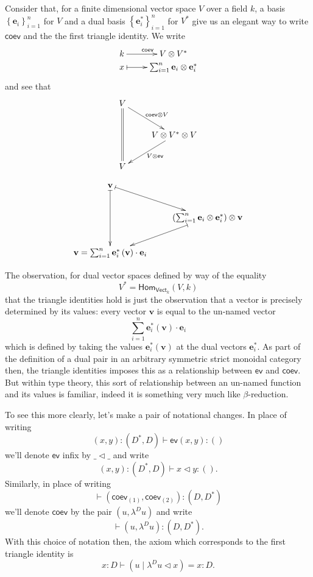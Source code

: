 \documentclass[pra,floatfix,
amsmath,superscriptaddress, 12pt]{article}
\theoremstyle{definition}
\newcommand{\evmap}{\mathsf{ev}}
\newcommand{\coev}{\mathsf{coev}}
\begin{document}
\par

Consider that, for a finite dimensional vector space $V$ over a field
$k$, a basis $\left\{ \mathbf{e}_{i}\right\} _{i=1}^{n}$ for $V$
and a dual basis $\left\{ \mathbf{e}_{i}^{*}\right\} _{i=1}^{n}$
for $V^{*}$ give us an elegant way to write $\coev$ and the the
first triangle identity. We write
\[
\xymatrixrowsep{0pc}\xymatrix{k\ar[r]^{\coev} & V\otimes V^{*}\\
x\ar@{|->}[r] & \sum_{i=1}^{n}\mathbf{e}_{i}\otimes\mathbf{e}_{i}^{*}
}
\]
and see that
\[
\begin{split}\vcenter{\vbox{\xymatrix{V\ar@{=}[dd]\ar[dr]^{\coev\otimes V}\\
 & V\otimes V^{*}\otimes V\ar[dl]^{V\otimes\evmap}\\
V
}
}}
\end{split}
\]

\[
\vcenter{\vbox{\xymatrix{\mathbf{v}\ar@{|->}[dd]\ar@{|->}[dr]\\
 & \left(\sum_{i=1}^{n}\mathbf{e}_{i}\otimes\mathbf{e}_{i}^{*}\right)\otimes\mathbf{v}\ar@{|->}[dl]\\
\mathbf{v}=\sum_{i=1}^{n}\mathbf{e}_{i}^{*}\left(\mathbf{v}\right)\cdot\mathbf{e}_{i}
}
}}
\]

\par

The observation, for dual vector spaces defined by way of the equality \[
V^*=\mathsf{Hom}_{\mathsf{Vect}_k}\left(V,k \right)
\]
that the triangle identities hold is just the observation that a vector is precisely determined by its values: every vector $\mathbf{v}$  is equal to the un-named vector
\[
\sum_{i=1}^{n}\mathbf{e}_i^*\left( \mathbf{v}\right)\cdot \mathbf{e}_i
\]
which is defined by taking the values $\mathbf{e}^*_{i}\left( \mathbf{v} \right)$ at the dual vectors $\mathbf{e}_i^*$.
As part of the definition of a dual pair in an arbitrary symmetric strict monoidal category then, the triangle identities imposes this as a relationship between $\evmap$ and $\coev$. But within type theory, this sort of relationship between an un-named function and its values is familiar, indeed it is something very much like $\beta$-reduction.

\par To see this more clearly, let's make a pair of notational changes. In place of writing 
\[
\left(x,y\right):\left(D^{*},D\right)\vdash\evmap\left(x,y\right):\left(\right)
\]
we'll denote $\evmap$ infix by $\_\triangleleft\_$ and write
\[
\left(x,y\right):\left(D^{*},D\right)\vdash x\triangleleft y:\left(\right).
\]
Similarly, in place of writing 
\[
\vdash\left(\coev_{\left(1\right)},\coev_{\left(2\right)}\right):\left(D,D^{*}\right)
\]
 we'll denote $\coev$ by the pair $\left(u,\lambda^{D}u\right)$
and write
\[
\vdash\left(u,\lambda^{D}u\right):\left(D,D^{*}\right).
\]
With this choice of notation then, the axiom which corresponds to
the first triangle identity is 
\[
x:D\vdash\left( u \; |\; \lambda^{D}u\triangleleft x\right)=x:D.
\]
\end{document}
